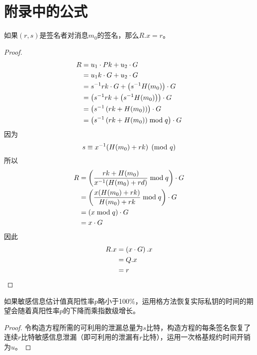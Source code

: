 \thispagestyle{appendixheader}
\setcounter{app_fig}{1}
\setcounter{app_tab}{1}
\setcounter{equation}{0}
\renewcommand\theequation{附\arabic{app}-\arabic{equation}}
\renewcommand\chaptername{附录}
\renewcommand\chaptername{Appendix} 
\renewcommand\thechapter{附录\zhnum{app}} 

\setcounter{chapter}{0}
\setcounter{section}{0}
\chapter{附录中的公式}\label{chap:app1}{
	\setcounter{app_fig}{1}
	\begin{proposition}\label{prop:ECDSA-authentication}
		如果$(r,s)$是签名者对消息$m_0$的签名，那么$R.x=r$。 
	\end{proposition}
	\begin{proof}
		\begin{align*}
			R&=u_1\cdot Pk+u_2\cdot G \\
			&= u_1k\cdot G+u_2\cdot G \\
			&= s^{-1}rk\cdot G+\left(s^{-1}H(m_0)\right)\cdot G \\
			&= \left(s^{-1}rk+\left(s^{-1}H(m_0)\right)\right)\cdot G \\
			&= \left(s^{-1}\left(rk+H(m_0)\right)\right)\cdot G \\
			&= \left(s^{-1}\left(rk+H(m_0)\right)\bmod q\right)\cdot G
		\end{align*}
		因为$$s\equiv x^{-1}(H(m_0)+rk) \pmod q$$
		所以\begin{align*}
			R&= \left(\frac{rk+H(m_0)}{x^{-1}(H(m_0)+rd)}\bmod q\right)\cdot G \\
			&= \left(\frac{x(H(m_0)+rk)}{H(m_0)+rk}\bmod q\right)\cdot G \\
			&= \left(x\bmod q\right)\cdot G \\
			&= x\cdot G
		\end{align*}
		因此\begin{align*}
			R.x&=\left(x\cdot G\right).x\\
			&=Q.x\\
			&=r
		\end{align*}
	\end{proof}
		
	\begin{proposition}\label{prop:expotime}
		如果敏感信息估计值真阳性率$p$略小于100\%，运用格方法恢复实际私钥的时间的期望会随着真阳性率$p$的下降而乘指数级增长。
	\end{proposition}
	\begin{proof}
		令构造方程所需的可利用的泄漏总量为$s$比特，构造方程的每条签名恢复了连续$r$比特敏感信息泄漏（即可利用的泄漏有$r$比特），运用一次格基规约时间开销为$u$。
		

\end{proof}}
